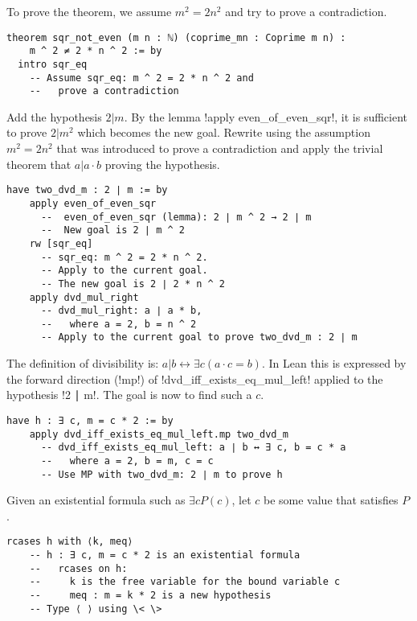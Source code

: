 
To prove the theorem, we assume $m^2=2n^2$ and try to prove a contradiction.
\begin{Verbatim}[firstnumber=last]
theorem sqr_not_even (m n : ℕ) (coprime_mn : Coprime m n) :
    m ^ 2 ≠ 2 * n ^ 2 := by
  intro sqr_eq
    -- Assume sqr_eq: m ^ 2 = 2 * n ^ 2 and
    --   prove a contradiction
\end{Verbatim}

Add the hypothesis $2|m$. By the lemma !apply even_of_even_sqr!, it is sufficient to prove $2 | m^2$ which becomes the new goal. Rewrite using the assumption $m^2=2n^2$ that was introduced to prove a contradiction and apply the trivial theorem that $a | a\cdot b$ proving the hypothesis.

\begin{Verbatim}[firstnumber=last]
  have two_dvd_m : 2 ∣ m := by
    apply even_of_even_sqr
      --  even_of_even_sqr (lemma): 2 ∣ m ^ 2 → 2 ∣ m
      --  New goal is 2 ∣ m ^ 2
    rw [sqr_eq]
      -- sqr_eq: m ^ 2 = 2 * n ^ 2.
      -- Apply to the current goal.
      -- The new goal is 2 ∣ 2 * n ^ 2
    apply dvd_mul_right
      -- dvd_mul_right: a ∣ a * b,
      --   where a = 2, b = n ^ 2
      -- Apply to the current goal to prove two_dvd_m : 2 ∣ m
\end{Verbatim}

The definition of divisibility is: $a|b\leftrightarrow \exists c ( a\cdot c = b)$. In Lean this is expressed by the forward direction (!mp!) of !dvd_iff_exists_eq_mul_left! applied to the hypothesis !2 ∣ m!. The goal is now to find such a $c$.
\begin{Verbatim}[firstnumber=last]
  have h : ∃ c, m = c * 2 := by
    apply dvd_iff_exists_eq_mul_left.mp two_dvd_m
      -- dvd_iff_exists_eq_mul_left: a ∣ b ↔ ∃ c, b = c * a
      --   where a = 2, b = m, c = c
      -- Use MP with two_dvd_m: 2 ∣ m to prove h
\end{Verbatim}
Given an existential formula such as $\exists c P(c)$, let $c$ be some value that satisfies $P$.
\begin{Verbatim}[firstnumber=last]
  rcases h with ⟨k, meq⟩
    -- h : ∃ c, m = c * 2 is an existential formula
    --   rcases on h:
    --     k is the free variable for the bound variable c
    --     meq : m = k * 2 is a new hypothesis
    -- Type ⟨ ⟩ using \< \>
\end{Verbatim}

